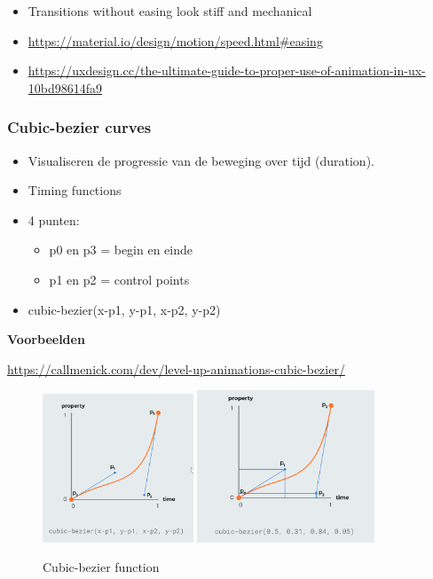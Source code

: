\documentclass{article}
\newcommand{\bold}[1]{\textbf{#1}}
\begin{document}
\begin{itemize}
    \item Transitions without easing look stiff and mechanical
    \item \url{https://material.io/design/motion/speed.html\#easing}
    \item \url{https://uxdesign.cc/the-ultimate-guide-to-proper-use-of-animation-in-ux-10bd98614fa9}
\end{itemize}


\subsubsection{Cubic-bezier curves}

\begin{itemize}
    \item Visualiseren de progressie van de beweging over tijd (duration).
    \item Timing functions
    \item 4 punten:
    \begin{itemize}
        \item p0 en p3 = begin en einde
        \item p1 en p2 = control points
    \end{itemize}
    \item cubic-bezier(x-p1, y-p1, x-p2, y-p2)
\end{itemize}

\bold{Voorbeelden}

\url{https://callmenick.com/dev/level-up-animations-cubic-bezier/}

\begin{figure}[H]
    \centering
    \includegraphics[width=0.4\textwidth]{animation-cubic-bezier.png}
    \includegraphics[width=0.47\textwidth]{animation-cubic-bezier2.png}
    \caption{Cubic-bezier function}
\end{figure}
\end{document}
